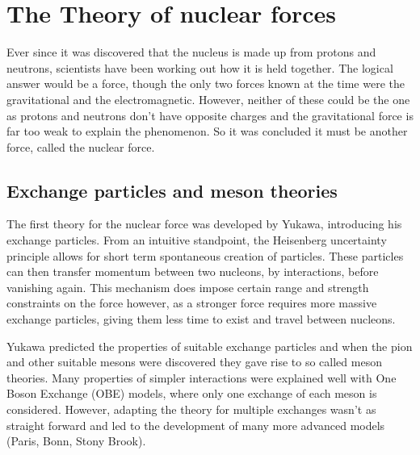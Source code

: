 \section{The Theory of nuclear forces}
Ever since it was discovered that the nucleus is made up from protons and neutrons, scientists have been working out how it is held together.
The logical answer would be a force, though the only two forces known at the time were the gravitational and the electromagnetic.
However, neither of these could be the one as protons and neutrons don't have opposite charges and the gravitational force is far too weak to explain the phenomenon.
So it was concluded it must be another force, called the nuclear force. \cite{hergert_guided_2020}


\subsection{Exchange particles and meson theories}
The first theory for the nuclear force was developed by Yukawa, introducing his exchange particles.
From an intuitive standpoint, the Heisenberg uncertainty principle allows for short term spontaneous creation of particles.
These particles can then transfer momentum between two nucleons, by interactions, before vanishing again.
This mechanism does impose certain range and strength constraints on the force however, as a stronger force requires more massive exchange particles, giving them less time to exist and travel between nucleons.

Yukawa predicted the properties of suitable exchange particles and when the pion and other suitable mesons were discovered they gave rise to so called meson theories. %
Many properties of simpler interactions were explained well with One Boson Exchange (OBE) models, where only one exchange of each meson is considered.
However, adapting the theory for multiple exchanges wasn't as straight forward and led to the development of many more advanced models (Paris, Bonn, Stony Brook). %


